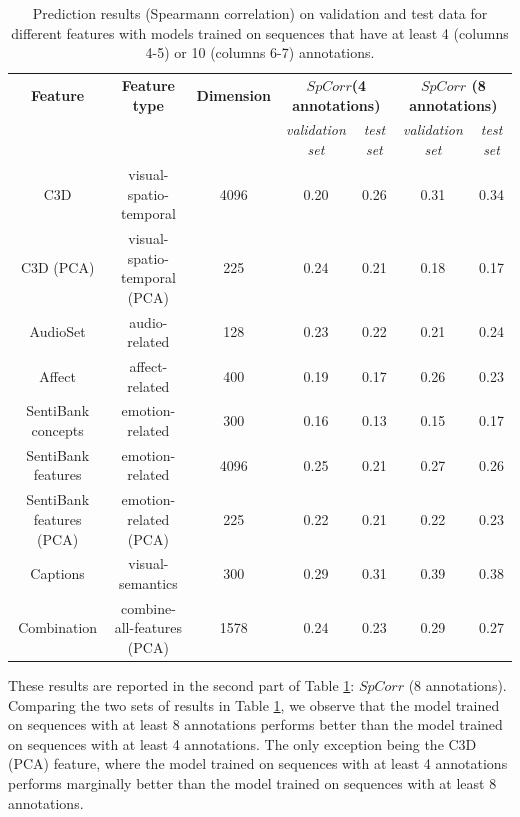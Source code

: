 \documentclass[sigconf]{acmart}
\begin{document}
\begin{table}
  \centering
  \renewcommand{\arraystretch}{1.2}
  \begin{tabular}{|c|c|c|c|c|c|c|}
    \hline
    \textbf{Feature} & \textbf{Feature type}& \textbf{Dimension}& \multicolumn{2}{c|}{\textbf{$SpCorr$(4 annotations)}} & \multicolumn{2}{c|}{\textbf{$SpCorr$ (8 annotations)}}\\
    \cline{4-7}
    & & & \emph{validation set}& \emph{test set} & \emph{validation set}& \emph{test set}\\ \hline
    C3D& visual-spatio-temporal& 4096& 0.20& 0.26& 0.31& 0.34\\ \hline
		C3D (PCA)& visual-spatio-temporal (PCA)& 225& 0.24& 0.21& 0.18& 0.17\\ \hline
		AudioSet& audio-related& 128& 0.23& 0.22& 0.21& 0.24\\ \hline
		Affect& affect-related& 400& 0.19& 0.17& 0.26& 0.23\\ \hline
		SentiBank concepts& emotion-related& 300& 0.16& 0.13& 0.15& 0.17\\ \hline
		SentiBank features& emotion-related& 4096& 0.25& 0.21& 0.27& 0.26\\ \hline
		SentiBank features (PCA)& emotion-related (PCA)& 225& 0.22& 0.21& 0.22& 0.23\\ \hline
		Captions& visual-semantics & 300& 0.29& 0.31& 0.39& 0.38 \\ \hline
		Combination& combine-all-features (PCA)& 1578& 0.24& 0.23& 0.29& 0.27\\ \hline		
    \hline
  \end{tabular}
  \caption{Prediction results (Spearmann correlation) on validation and test data for different features with models trained on sequences that have at least 4 (columns 4-5) or 10 (columns 6-7) annotations.}
	\label{res-4-10-ann}	
\end{table}

These results are reported in the second part of Table \ref{res-4-10-ann}: $SpCorr$ (8 annotations).
Comparing the two sets of results in Table \ref{res-4-10-ann}, we observe that the model trained on sequences with at least 8 annotations performs better than the model trained on sequences with at least 4 annotations.
The only exception being the C3D (PCA) feature, where the model trained on sequences with at least 4 annotations performs marginally better than the model trained on sequences with at least 8 annotations. 
\end{document}
